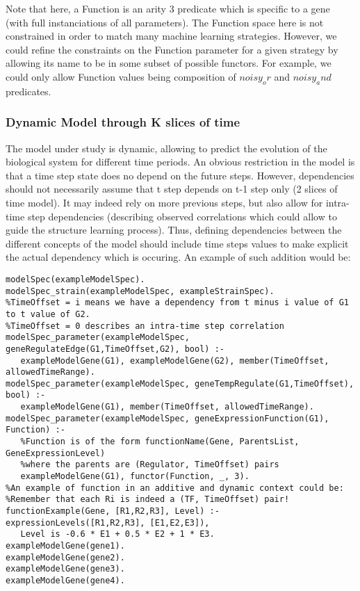 \documentclass{article}
\begin{document}
Note that here, a Function is an arity 3 predicate which is specific to a gene (with full instanciations of all parameters). The Function space here is not constrained in order to match many machine learning strategies. However, we could refine the constraints on the Function parameter for a given strategy by allowing its name to be in some subset of possible functors. For example, we could only allow Function values being composition of $noisy_or$ and $noisy_and$ predicates.

\subsubsection{Dynamic Model through K slices of time}

The model under study is dynamic, allowing to predict the evolution of the biological system for different time periods. An obvious restriction in the model is that a time step state does no depend on the future steps. However, dependencies should not necessarily assume that t step depends on t-1 step only (2 slices of time model). It may indeed rely on more previous steps, but also allow for intra-time step dependencies (describing observed correlations which could allow to guide the structure learning process). Thus, defining dependencies between the different concepts of the model should include time steps values to make explicit the actual dependency which is occuring. An example of such addition would be:
  
\begin{verbatim}
modelSpec(exampleModelSpec).
modelSpec_strain(exampleModelSpec, exampleStrainSpec). 
%TimeOffset = i means we have a dependency from t minus i value of G1 to t value of G2.
%TimeOffset = 0 describes an intra-time step correlation
modelSpec_parameter(exampleModelSpec, geneRegulateEdge(G1,TimeOffset,G2), bool) :-
   exampleModelGene(G1), exampleModelGene(G2), member(TimeOffset, allowedTimeRange).
modelSpec_parameter(exampleModelSpec, geneTempRegulate(G1,TimeOffset), bool) :-
   exampleModelGene(G1), member(TimeOffset, allowedTimeRange).
modelSpec_parameter(exampleModelSpec, geneExpressionFunction(G1), Function) :-
   %Function is of the form functionName(Gene, ParentsList, GeneExpressionLevel) 
   %where the parents are (Regulator, TimeOffset) pairs
   exampleModelGene(G1), functor(Function, _, 3).
%An example of function in an additive and dynamic context could be:
%Remember that each Ri is indeed a (TF, TimeOffset) pair!
functionExample(Gene, [R1,R2,R3], Level) :- expressionLevels([R1,R2,R3], [E1,E2,E3]), 
   Level is -0.6 * E1 + 0.5 * E2 + 1 * E3.
exampleModelGene(gene1).
exampleModelGene(gene2).
exampleModelGene(gene3).
exampleModelGene(gene4).
\end{verbatim}
\end{document}
